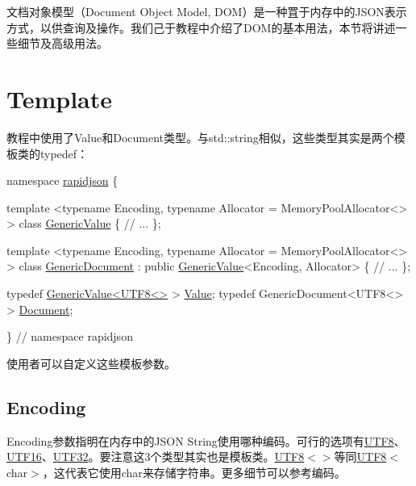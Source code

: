 文档对象模型（\+Document Object Model, D\+O\+M）是一种罝于内存中的\+J\+S\+O\+N表示方式，以供查询及操作。我们己于教程中介绍了\+D\+O\+M的基本用法，本节将讲述一些细节及高级用法。\hypertarget{md_Commun_Externe_RapidJSON_doc_dom.zh-cn_Template}{}\section{Template}\label{md_Commun_Externe_RapidJSON_doc_dom.zh-cn_Template}
教程中使用了{\ttfamily Value}和{\ttfamily Document}类型。与{\ttfamily std\+::string}相似，这些类型其实是两个模板类的{\ttfamily typedef}：


\begin{DoxyCode}
\textcolor{keyword}{namespace }\hyperlink{namespacerapidjson}{rapidjson} \{

\textcolor{keyword}{template} <\textcolor{keyword}{typename} Encoding, \textcolor{keyword}{typename} Allocator = MemoryPoolAllocator<> >
\textcolor{keyword}{class }\hyperlink{class_generic_value}{GenericValue} \{
    \textcolor{comment}{// ...}
\};

\textcolor{keyword}{template} <\textcolor{keyword}{typename} Encoding, \textcolor{keyword}{typename} Allocator = MemoryPoolAllocator<> >
\textcolor{keyword}{class }\hyperlink{class_generic_document}{GenericDocument} : \textcolor{keyword}{public} \hyperlink{class_generic_value}{GenericValue}<Encoding, Allocator> \{
    \textcolor{comment}{// ...}
\};

\textcolor{keyword}{typedef} \hyperlink{class_generic_value}{GenericValue<UTF8<>} > \hyperlink{document_8h_a071cf97155ba72ac9a1fc4ad7e63d481}{Value};
\textcolor{keyword}{typedef} GenericDocument<UTF8<> > \hyperlink{document_8h_ac6ea5b168e3fe8c7fa532450fc9391f7}{Document};

\} \textcolor{comment}{// namespace rapidjson}
\end{DoxyCode}


使用者可以自定义这些模板参数。\hypertarget{md_Commun_Externe_RapidJSON_doc_dom.zh-cn_Encoding}{}\subsection{Encoding}\label{md_Commun_Externe_RapidJSON_doc_dom.zh-cn_Encoding}
{\ttfamily Encoding}参数指明在内存中的\+J\+S\+ON String使用哪种编码。可行的选项有{\ttfamily \hyperlink{struct_u_t_f8}{U\+T\+F8}}、{\ttfamily \hyperlink{struct_u_t_f16}{U\+T\+F16}}、{\ttfamily \hyperlink{struct_u_t_f32}{U\+T\+F32}}。要注意这3个类型其实也是模板类。{\ttfamily \hyperlink{struct_u_t_f8}{U\+T\+F8}$<$$>$}等同{\ttfamily \hyperlink{struct_u_t_f8}{U\+T\+F8}$<$char$>$}，这代表它使用{\ttfamily char}来存储字符串。更多细节可以参考编码。

